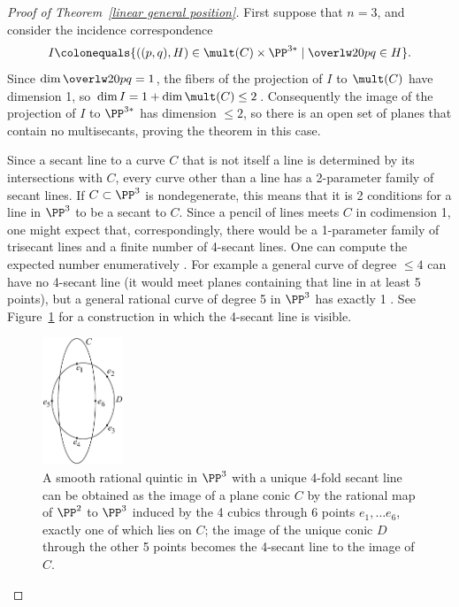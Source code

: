 \begin{proof}[Proof of Theorem~\ref{linear general position}]
First suppose that $n=3$, and consider the incidence correspondence
$$
I \colonequals  \{ ((p,q), H) \in \mult(C) \times \PP^{3*} \mid
\overlw20{pq}\in H\}.
$$
Since $\dim \overlw20{pq} = 1$, the fibers of the projection of $I$
to $\mult(C)$ have dimension 1,
so $\dim I = 1+\dim \mult(C)  \leq 2$. Consequently the image of  the
projection of $I$ to $\PP^{3*}$ has
dimension $\leq 2$, so there is an open set of planes that contain no
multisecants, proving the theorem in this case.

\begin{fact}
 Since a secant line to a curve $C$ that is not itself a line is
 determined by its intersections with $C$,
 every curve other than a line has a 2-parameter family of secant
 lines. If $C\subset \PP^3$ is nondegenerate,
 this means that it is 2 conditions for a line in $\PP^3$ to be a secant
 to $C$. Since a pencil of lines meets
 $C$ in codimension 1, one might expect that, correspondingly, there
 would be a 1-parameter family
 of trisecant lines and a finite number of 4-secant lines. One can
 compute the expected number enumeratively
 \cite[p.~296]{Griffiths-Harris1978}.
 For example a general curve of degree $\leq 4$ can have no 4-secant
 line (it would meet planes containing that line in at least 5 points),
 but a general rational curve of degree 5 in $\PP^3$
  has exactly 1 \cite[Section 12.4.4]{3264}. See  Figure~\ref{9.2}
  for a construction in which the 4-secant line is visible.

\begin{figure}[b]
\centerline {\includegraphics[height=1.5in]{"main/Fig09-2"}}
\caption{A smooth rational quintic in $\PP^{3}$ with a unique 4-fold
secant line
can be obtained as the image of a plane conic $C$ by the rational map
of $\PP^{2}$ to $\PP^{3}$
induced by the 4 cubics through 6 points $e_{1},\dots e_{6}$, exactly
one of which lies on $C$; the image of the unique conic $D$ through the
other 5 points becomes the 4-secant line to the image of $C$.
}
\label{9.2}
\end{figure}


\end{fact}
\end{proof}
